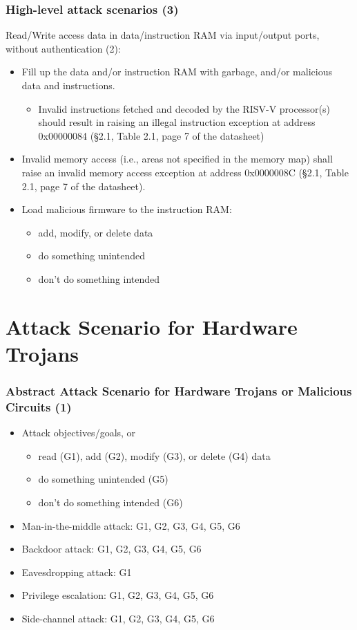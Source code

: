 \documentclass[xcolor={usenames,dvipsnames},hyperref={hyperindex,bookmarks}]{beamer}
\begin{document}
\frame
{
	\frametitle{High-level attack scenarios (3)}

	Read/Write access data in data/instruction RAM via input/output ports, without authentication (2):
	\begin{itemize}
	\item Fill up the data and/or instruction RAM with garbage, and/or malicious data and instructions.
		\begin{itemize}
		\item Invalid instructions fetched and decoded by the RISV-V processor(s) should result in raising an illegal instruction exception at address 0x00000084 (\S2.1, Table 2.1, page 7 of the datasheet)
		\end{itemize}
	\item Invalid memory access (i.e., areas not specified in the memory map) shall raise an invalid memory access exception at address 0x0000008C (\S2.1, Table 2.1, page 7 of the datasheet).
	\item Load malicious firmware to the instruction RAM:
		\begin{itemize}
		\item add, modify, or delete data
		\item do something unintended
		\item don't do something intended
		\end{itemize}
	\end{itemize}
}






\section{Attack Scenario for Hardware Trojans}

\frame
{
	\frametitle{Abstract Attack Scenario for Hardware Trojans or Malicious Circuits (1)}

	\begin{itemize}
	\item Attack objectives/goals, or 
		\begin{itemize}
		\item read (G1), add (G2), modify (G3), or delete (G4) data
		\item do something unintended (G5)
		\item don't do something intended (G6)
		\end{itemize}
	\item Man-in-the-middle attack: G1, G2, G3, G4, G5, G6
	\item Backdoor attack: G1, G2, G3, G4, G5, G6
	\item Eavesdropping attack: G1
	\item Privilege escalation: G1, G2, G3, G4, G5, G6
	\item Side-channel attack: G1, G2, G3, G4, G5, G6
	\end{itemize}
}
\end{document}
